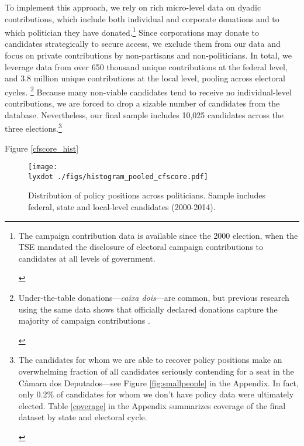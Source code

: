 \documentclass[12pt,english]{article}
\newcommand{\note}[1]{\footnote{ \begin{doublespace}#1  \end{doublespace}}}
\newcommand{\lyxdot}{.}
\numberwithin{equation}{section}
\theoremstyle{plain}
\theoremstyle{remark}
\theoremstyle{plain}
\begin{document}
To implement this approach, we rely on rich micro-level data on dyadic contributions, which include both individual and corporate donations and to which politician they have donated.\note{\normalsize The campaign contribution data is available since the 2000 election, when the TSE mandated the disclosure of electoral campaign contributions to candidates at all levels of government.%
}  Since corporations may donate to candidates strategically to secure access, we exclude them from our data and focus on private contributions by non-partisans and non-politicians. In total, we leverage data from over 650 thousand unique contributions at the federal level, and 3.8 million unique contributions at the local level, pooling across electoral cycles.%
\note{\normalsize Under-the-table donations---\emph{caixa dois}---are common, but previous research using the same data shows that officially declared donations capture the majority of campaign contributions \cite{BoasHidalgoRichardson2014}.} Because many non-viable candidates tend to receive no individual-level contributions, we are forced to drop a sizable number of candidates from the database. Nevertheless, our final sample includes %
10,025 candidates across the three elections.\note{\normalsize The candidates for whom we are able to recover policy positions make an overwhelming fraction of all candidates seriously contending for a seat in the  C\^{a}mara dos Deputados---see Figure \ref{fig:smallpeople} in the Appendix. In fact, only 0.2\% of candidates for whom we don't have policy data were ultimately elected. Table \ref{coverage} in the Appendix summarizes coverage of the final dataset by state and electoral cycle.}

Figure \ref{cfscore_hist}

\begin{figure}[h]
  \centering
  \texttt{[image: \\lyxdot ./figs/histogram\_pooled\_cfscore.pdf]}
  \caption{Distribution of policy positions across politicians. Sample includes federal, state and local-level candidates (2000-2014).}
  \label{fig:cfscore_hist}
\end{figure}
\end{document}
